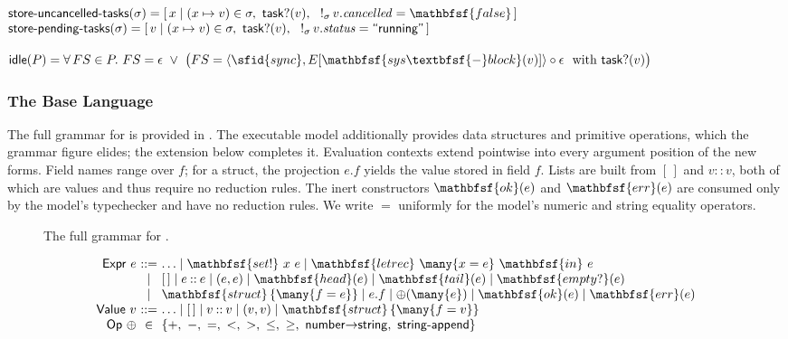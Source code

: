 \vspace{0.75em}
\noindent
$\begin{array}{@{}l@{}}
\mathsf{store\text{-}uncancelled\text{-}tasks}(\sigma) =
  [\, x \mid (x \mapsto v) \in \sigma,\ \mathsf{task?}(v),\
     \ !_{\sigma}\, v.\mathit{cancelled} = \mathbfsf{false} \,] \\
\mathsf{store\text{-}pending\text{-}tasks}(\sigma) =
  [\, v \mid (x \mapsto v) \in \sigma,\ \mathsf{task?}(v),\
     \ !_{\sigma}\, v.\mathit{status} = \textsf{``running''} \,]
\end{array}$

\vspace{0.75em}
\noindent
$\begin{array}{@{}l@{}}
\mathsf{idle}(P) = \forall\, FS \in P.\
  FS = \epsilon\ \lor\
  \big(FS = \langle \sfid{sync}, E[\mathbfsf{sys\textbfsf{-}block}(v)] \rangle \circ \epsilon\
  \ \text{with}\ \mathsf{task?}(v)\big)
\end{array}$


\subsubsection{The Base Language \lc}\label{app:semantics:lc}

The full grammar for \lc is provided in . The executable model additionally provides data structures and primitive operations, which the grammar figure elides; the extension below completes it. Evaluation contexts extend pointwise into every argument position of the new forms. Field names range over $f$; for a struct, the projection $e.f$ yields the value stored in field $f$. Lists are built from $[\,]$ and $v \mathbin{::} v$, both of which are values and thus require no reduction rules. The inert constructors $\mathbfsf{ok}(e)$ and $\mathbfsf{err}(e)$ are consumed only by the model's typechecker and have no reduction rules. We write $=$ uniformly for the model's numeric and string equality operators.

\begin{figure}[h]
  
  \cprotect\caption{The full grammar for \lc.}
  \label{fig:app:lc-grammar}
\end{figure}

$$
\begin{array}{r@{\ }c@{\ }l}
\mathsf{Expr}\ e       & ::=  & \ldots \mid \mathbfsf{set!}\ x\ e \mid \mathbfsf{letrec}\ \many{x = e}\ \mathbfsf{in}\ e \\
                       & \mid & [\,] \mid e \mathbin{::} e \mid (e, e) \mid \mathbfsf{head}(e) \mid \mathbfsf{tail}(e) \mid \mathbfsf{empty?}(e) \\
                       & \mid & \mathbfsf{struct}\,\{\many{f = e}\} \mid e.f \mid \oplus(\many{e}) \mid \mathbfsf{ok}(e) \mid \mathbfsf{err}(e) \\
\mathsf{Value}\ v      & ::=  & \ldots \mid [\,] \mid v \mathbin{::} v \mid (v, v) \mid \mathbfsf{struct}\,\{\many{f = v}\} \\
\mathsf{Op}\ \oplus    & \in  & \{ +,\ -,\ =,\ <,\ >,\ \leq,\ \geq,\ \mathsf{number{\to}string},\ \mathsf{string\text{-}append} \}
\end{array}
$$

